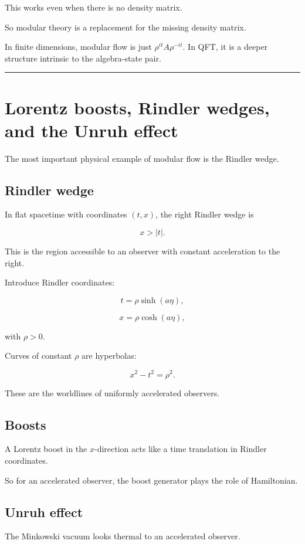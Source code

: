 \documentclass[11pt,a4paper]{article}
\begin{document}
This works even when there is no density matrix.

So modular theory is a replacement for the missing density matrix.

In finite dimensions, modular flow is just $\rho^{it}A\rho^{-it}$. In QFT, it is a deeper structure intrinsic to the algebra-state pair.

\medskip\hrule\medskip

\section{Lorentz boosts, Rindler wedges, and the Unruh effect}

The most important physical example of modular flow is the Rindler wedge.

\subsection{Rindler wedge}

In flat spacetime with coordinates $(t,x)$, the right Rindler wedge is

\[
x>|t|.
\]

This is the region accessible to an observer with constant acceleration to the right.

Introduce Rindler coordinates:

\[
t=\rho\sinh(a\eta),
\]

\[
x=\rho\cosh(a\eta),
\]

with $\rho>0$.

Curves of constant $\rho$ are hyperbolas:

\[
x^2-t^2=\rho^2.
\]

These are the worldlines of uniformly accelerated observers.

\subsection{Boosts}

A Lorentz boost in the $x$-direction acts like a time translation in Rindler coordinates.

So for an accelerated observer, the boost generator plays the role of Hamiltonian.

\subsection{Unruh effect}

The Minkowski vacuum looks thermal to an accelerated observer.
\end{document}
